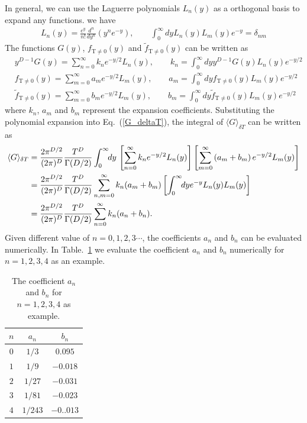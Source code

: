 \documentclass[sn-mathphys,Numbered]{sn-jnl}
\begin{document}
In general, we can use the Laguerre polynomials $L_n(y)$ as a orthogonal basis to expand any functions. we have
\begin{align}
L_n(y)=\frac{e^y}{n!}\frac{d^n}{dy^n}\left(y^ne^{-y}\right),\qquad\int_0^\infty\!\!dyL_n(y)L_m(y)e^{-y}=\delta_{nm}
\end{align}
The functions $G(y)$, $f_\mathrm{T\neq0}(y)$ and $\tilde f_\mathrm{T\neq0}(y)$ can be written as
\begin{align}
&y^{D-1}G(y)=\sum_{n=0}^\infty k_n e^{-y/2}L_n(y),\qquad k_n=\int_0^\infty\!\!dy y^{D-1}G(y)L_n(y)e^{-y/2}\\
&f_\mathrm{T\neq0}(y)=\sum_{m=0}^\infty a_m e^{-y/2}L_m(y),\qquad a_m=\int_0^\infty\!\!dy f_\mathrm{T\neq0}(y)L_m(y)e^{-y/2}\\
&\tilde f_\mathrm{T\neq0}(y)=\sum_{m=0}^\infty b_m e^{-y/2}L_m(y),\qquad b_m=\int_0^\infty\!\!dy \tilde f_\mathrm{T\neq0}(y)L_m(y)e^{-y/2}
\end{align}
where $k_n$, $a_m$ and $b_m$ represent the expansion coefficients. Substituting the polynomial expansion into Eq.~(\ref{G_deltaT}), the integral of $\langle G\rangle_{\delta T}$ can be written as
\begin{align}
\langle G\rangle_{\delta T}&=\frac{2\pi^{D/2}}{(2\pi)^D}\frac{T^D}{\Gamma(D/2)}\int^{\infty}_{0}\!\!dy\,\left[\sum_{n=0}^\infty k_n e^{-y/2}L_n(y)\right]\left[\sum_{m=0}^\infty \left(a_m+b_m\right) e^{-y/2}L_m(y)\right]\notag\\
&=\frac{2\pi^{D/2}}{(2\pi)^D}\frac{T^D}{\Gamma(D/2)}\sum_{n,m=0}^\infty k_n(a_m+b_m)\left[\int_0^\infty\!\!dy e^{-y}L_n(y)L_m(y)\right]\notag\\
&=\frac{2\pi^{D/2}}{(2\pi)^D}\frac{T^D}{\Gamma(D/2)}\sum^\infty_{n=0}k_n(a_n+b_n).
\end{align}
Given different value of $n=0,1,2,3\cdots$, the coefficients $a_n$ and $b_n$ can be evaluated numerically. In Table.~\ref{coeff_table} we evaluate the coefficient $a_n$ and $b_n$ numerically for $n=1,2,3,4$ as an example.  %
\begin{table}%
\centering
\begin{tabular}{c | c | c }
\hline\hline
$n$ &$a_n$ & $b_n$ \\
\hline
$0$ & $1/3$ & $0.095$\\ 
\hline
$1$ & $1/9$ & $-0.018$\\
\hline
$2$ & $1/27$& $-0.031$\\
\hline
 $3$ & $1/81$&$-0.023$\\
\hline
$4$ & $1/243$ & $-0..013$\\
\hline\hline
\end{tabular}
\caption{The coefficient $a_n$ and $b_n$ for $n=1,2,3,4$ as example.}
\label{coeff_table} 
\end{table}
\end{document}
